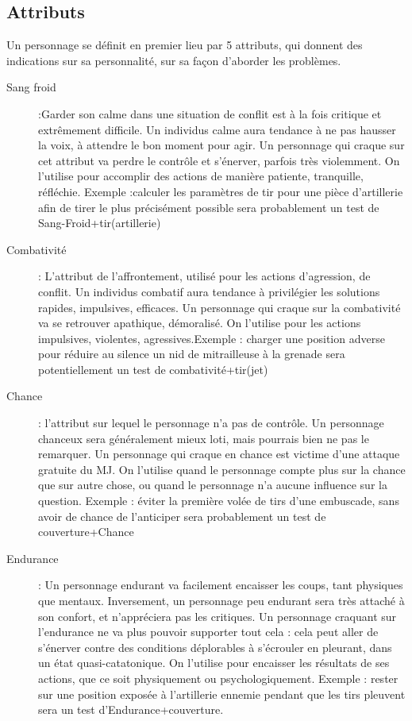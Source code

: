 \documentclass{report}
\begin{document}
\begin{multicols}{2}
\section{Attributs}
Un personnage se définit en premier lieu par 5 attributs, qui donnent des indications sur sa personnalité, sur sa façon d'aborder les problèmes.
\begin{description}
    \item[Sang froid] :Garder son calme dans une situation de conflit est à la fois critique et extrêmement difficile. Un individus calme aura tendance à ne pas hausser la voix, à attendre le bon moment pour agir. Un personnage qui craque sur cet attribut va perdre le contrôle et s'énerver, parfois très violemment. On l'utilise pour accomplir des actions de manière patiente, tranquille, réfléchie. Exemple :calculer les paramètres de tir pour une pièce d'artillerie afin de tirer le plus précisément possible sera probablement un test de Sang-Froid+tir(artillerie)
    \item[Combativité]: L'attribut de l'affrontement, utilisé pour les actions d'agression, de conflit. Un individus combatif aura tendance à privilégier les solutions rapides, impulsives, efficaces. Un personnage qui craque sur la combativité va se retrouver apathique, démoralisé. On l'utilise pour les actions impulsives, violentes, agressives.Exemple : charger une position adverse pour réduire au silence un nid de mitrailleuse à la grenade sera potentiellement un test de combativité+tir(jet)%
    \item[Chance]: l'attribut sur lequel le personnage n'a pas de contrôle. Un personnage chanceux sera généralement mieux loti, mais pourrais bien ne pas le remarquer. Un personnage qui craque en chance est victime d'une attaque gratuite du MJ. On l'utilise quand le personnage compte plus sur la chance que sur autre chose, ou quand le personnage n'a aucune influence sur la question. Exemple : éviter la première volée de tirs d'une embuscade, sans avoir de chance de l'anticiper sera probablement un test de couverture+Chance
    \item[Endurance]: Un personnage endurant va facilement encaisser les coups, tant physiques que mentaux. Inversement, un personnage peu endurant sera très attaché à son confort, et n'appréciera pas les critiques. Un personnage craquant sur l'endurance ne va plus pouvoir supporter tout cela : cela peut aller de s'énerver contre des conditions déplorables à s'écrouler en pleurant, dans un état quasi-catatonique. On l'utilise pour encaisser les résultats de ses actions, que ce soit physiquement ou psychologiquement. Exemple : rester sur une position exposée à l'artillerie ennemie pendant que les tirs pleuvent sera un test d'Endurance+couverture.

\end{description}
\end{multicols}
\end{document}

